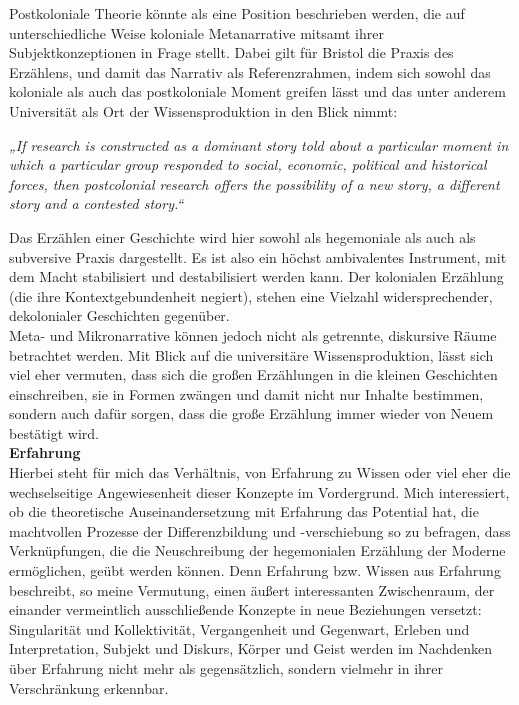 \noindent Postkoloniale Theorie könnte als eine Position beschrieben werden, die  auf
unterschiedliche Weise  koloniale Metanarrative mitsamt ihrer
Subjektkonzeptionen in Frage stellt. Dabei gilt für Bristol die Praxis des
Erzählens, und damit das Narrativ als Referenzrahmen, indem sich sowohl das
koloniale als auch das postkoloniale Moment greifen lässt und das unter anderem
Universität als Ort der Wissensproduktion in den Blick nimmt:
\begin{myenv} \textit{  „If research is constructed as a dominant story told
    about a particular moment in which a particular group responded to social,
    economic, political and historical forces, then postcolonial research
    offers the possibility of a new story, a different story and a contested
story.“\footnotemark {} } \end{myenv}
Das Erzählen einer Geschichte wird hier sowohl als hegemoniale als auch als
subversive Praxis dargestellt. Es ist also ein höchst ambivalentes Instrument,
mit dem Macht stabilisiert und destabilisiert werden kann. Der kolonialen
Erzählung (die ihre Kontextgebundenheit negiert), stehen eine Vielzahl
widersprechender, dekolonialer Geschichten gegenüber.\\

\noindent Meta- und Mikronarrative können jedoch nicht als getrennte, diskursive Räume
betrachtet werden. Mit Blick auf die universitäre Wissensproduktion, lässt sich
viel eher vermuten, dass sich die großen Erzählungen in die kleinen Geschichten
einschreiben, sie in Formen zwängen und damit nicht nur Inhalte bestimmen,
sondern auch dafür sorgen, dass die große Erzählung immer wieder von Neuem
bestätigt wird.\\

\noindent\textbf{\large Erfahrung}\\
Hierbei steht für mich das Verhältnis, von Erfahrung zu Wissen oder viel eher
die wechselseitige Angewiesenheit dieser Konzepte im Vordergrund. Mich
interessiert, ob die theoretische Auseinandersetzung mit Erfahrung das
Potential hat, die machtvollen Prozesse der Differenzbildung und -verschiebung
so zu befragen, dass Verknüpfungen, die die Neuschreibung der hegemonialen
Erzählung der Moderne ermöglichen, geübt werden können. Denn Erfahrung bzw.
Wissen aus Erfahrung beschreibt, so meine Vermutung, einen äußert interessanten
Zwischenraum, der einander vermeintlich ausschließende Konzepte in neue
Beziehungen versetzt: \\
Singularität und Kollektivität, Vergangenheit und
Gegenwart, Erleben und Interpretation, Subjekt und Diskurs, Körper und Geist
werden im Nachdenken über Erfahrung nicht mehr als gegensätzlich, sondern
vielmehr in ihrer Verschränkung erkennbar.\\

